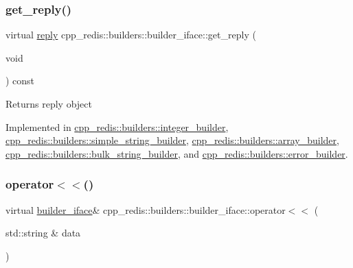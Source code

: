 \subsubsection{\texorpdfstring{get\+\_\+reply()}{get\_reply()}}
{\footnotesize\ttfamily virtual \hyperlink{classcpp__redis_1_1reply}{reply} cpp\+\_\+redis\+::builders\+::builder\+\_\+iface\+::get\+\_\+reply (\begin{DoxyParamCaption}\item[{void}]{ }\end{DoxyParamCaption}) const\hspace{0.3cm}{\ttfamily [pure virtual]}}

\begin{DoxyReturn}{Returns}
reply object 
\end{DoxyReturn}


Implemented in \hyperlink{classcpp__redis_1_1builders_1_1integer__builder_a25221763ba6f8b740458c673945208e0}{cpp\+\_\+redis\+::builders\+::integer\+\_\+builder}, \hyperlink{classcpp__redis_1_1builders_1_1simple__string__builder_a24ad0968d7d02172a65cf8982c540d51}{cpp\+\_\+redis\+::builders\+::simple\+\_\+string\+\_\+builder}, \hyperlink{classcpp__redis_1_1builders_1_1array__builder_ac5c805ad87b357a9578c5a0d479109b3}{cpp\+\_\+redis\+::builders\+::array\+\_\+builder}, \hyperlink{classcpp__redis_1_1builders_1_1bulk__string__builder_a56d6d3089107a1bccd63f6a5267c16cb}{cpp\+\_\+redis\+::builders\+::bulk\+\_\+string\+\_\+builder}, and \hyperlink{classcpp__redis_1_1builders_1_1error__builder_ae2b68b7daad4d71b6780e47bdcc1e32b}{cpp\+\_\+redis\+::builders\+::error\+\_\+builder}.

\mbox{\label{classcpp__redis_1_1builders_1_1builder__iface_a9892bbc9c887c31c2742dad4476e2fa6}} 
\subsubsection{\texorpdfstring{operator$<$$<$()}{operator<<()}}
{\footnotesize\ttfamily virtual \hyperlink{classcpp__redis_1_1builders_1_1builder__iface}{builder\+\_\+iface}\& cpp\+\_\+redis\+::builders\+::builder\+\_\+iface\+::operator$<$$<$ (\begin{DoxyParamCaption}\item[{std\+::string \&}]{data }\end{DoxyParamCaption})\hspace{0.3cm}{\ttfamily [pure virtual]}}

